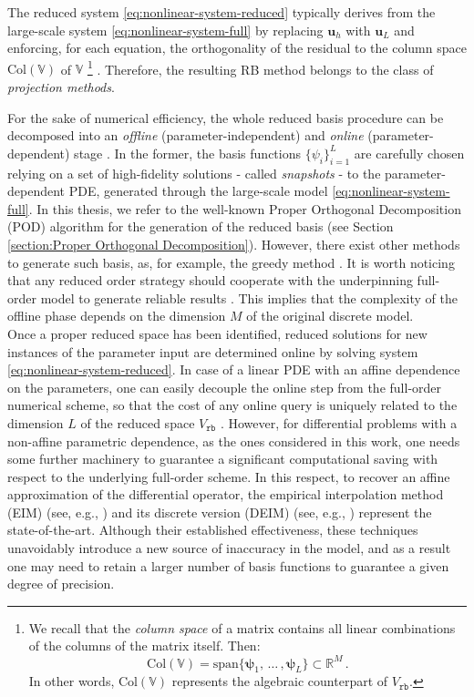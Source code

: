 \documentclass[12pt, a4paper, twoside, openright, notitlepage]{report}
\numberwithin{equation}{chapter}
\theoremstyle{theorem}
\theoremstyle{definition}
\theoremstyle{remark}
\theoremstyle{proposition}
\numberwithin{figure}{chapter}
\begin{document}
		The reduced system \eqref{eq:nonlinear-system-reduced} typically derives from the large-scale system \eqref{eq:nonlinear-system-full} by replacing $\mathbf{u}_h$ with $\mathbf{u}_L$ and enforcing, for each equation, the orthogonality of the residual to the column space $\text{Col}(\mathbb{V})$ of $\mathbb{V}$ \footnote{We recall that the \emph{column space} of a matrix contains all linear combinations of the columns of the matrix itself. Then: \begin{equation*} \text{Col}(\mathbb{V}) = \text{span} \big\lbrace \boldsymbol{\psi}_1, \, \ldots \, , \boldsymbol{\psi}_L \big\rbrace \subset \mathbb{R}^M \, . \end{equation*} In other words, $\text{Col}(\mathbb{V})$ represents the algebraic counterpart of $V_{\texttt{rb}}$.} \cite{MN16}. Therefore, the resulting RB method belongs to the class of \emph{projection methods}. 
		
		For the sake of numerical efficiency, the whole reduced basis procedure can be decomposed into an \emph{offline} (parameter-independent) and \emph{online} (parameter-dependent) stage \cite{Pru02}. In the former, the basis functions $\big\lbrace \psi_i \big\rbrace_{i = 1}^L$ are carefully chosen relying on a set of high-fidelity solutions - called \emph{snapshots} - to the parameter-dependent PDE, generated through the large-scale model \eqref{eq:nonlinear-system-full}. In this thesis, we refer to the well-known Proper Orthogonal Decomposition (POD) \cite{Vol08} algorithm for the generation of the reduced basis (see Section \ref{section:Proper Orthogonal Decomposition}). However, there exist other methods to generate such basis, as, for example, the greedy method \cite{HSZ14}. It is worth noticing that any reduced order strategy should cooperate with the underpinning full-order model to generate reliable results \cite{HSR16}. This implies that the complexity of the offline phase depends on the dimension $M$ of the original discrete model. \\
		Once a proper reduced space has been identified, reduced solutions for new instances of the parameter input are determined online by solving system \eqref{eq:nonlinear-system-reduced}. In case of a linear PDE with an affine dependence on the parameters, one can easily decouple the online step from the full-order numerical scheme, so that the cost of any online query is uniquely related to the dimension $L$ of the reduced space $V_{\texttt{rb}}$ \cite{QMN15}. However, for differential problems with a non-affine parametric dependence, as the ones considered in this work, one needs some further machinery to guarantee a significant computational saving with respect to the underlying full-order scheme. In this respect, to recover an affine approximation of the differential operator, the empirical interpolation method (EIM) (see, e.g., \cite{Bar04}) and its discrete version (DEIM) (see, e.g., \cite{Cha10}) represent the state-of-the-art. Although their established effectiveness, these techniques unavoidably introduce a new source of inaccuracy in the model, and as a result one may need to retain a larger number of basis functions to guarantee a given degree of precision.
		
\end{document}
